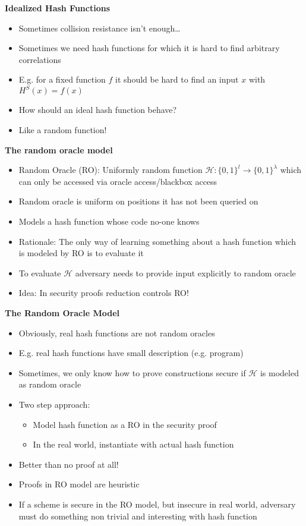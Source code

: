 \textbf{Idealized Hash Functions}
\begin{itemize}
    \item Sometimes collision resistance isn’t enough…
    \item Sometimes we need hash functions for which it is hard to find arbitrary correlations
    \item E.g. for a fixed function $f$ it should be hard to find an input $x$ with $H^S(x)=f(x)$
    \item How should an ideal hash function behave?
    \item Like a random function!\newline
\end{itemize}


\textbf{The random oracle model}
\begin{itemize}
    \item Random Oracle (RO): Uniformly random function $\mathcal{H}: \{0,1\}^l \to \{0,1\}^{\lambda}$ which can only be accessed via oracle access/blackbox access
    \item Random oracle is uniform on positions it has not been queried on
    \item Models a hash function whose code no-one knows
    \item Rationale: The only way of learning something about a hash function which is modeled by RO is to evaluate it
    \item To evaluate $\mathcal{H}$ adversary needs to provide input explicitly to random oracle
    \item Idea: In security proofs reduction controls RO!\newline
\end{itemize}


\textbf{The Random Oracle Model}
\begin{itemize}
    \item Obviously, real hash functions are not random oracles
    \item E.g. real hash functions have small description (e.g. program)
    \item Sometimes, we only know how to prove constructions secure if $\mathcal{H}$ is modeled as random oracle
    \item Two step approach:
    \begin{itemize}
        \item Model hash function as a RO in the security proof
        \item In the real world, instantiate with actual hash function
    \end{itemize}
    \item Better than no proof at all!
    \item Proofs in RO model are heuristic
    \item If a scheme is secure in the RO model, but insecure in real world, adversary must do something non trivial and interesting with hash function\newline
\end{itemize}


